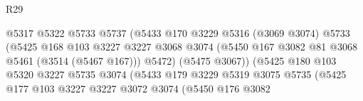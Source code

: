 \begin{lexlean}{R29}
\begin{coremodule}
                                            @5317
                                            @5322
                                            @5733
                                            @5737
                                            (@5433
                                              @170
                                              @3229
                                              @5316
                                              (@3069 @3074)
                                              @5733
                                              (@5425
                                                @168
                                                @103
                                                @3227
                                                @3227
                                                @3068
                                                @3074
                                                (@5450
                                                  @167
                                                  @3082
                                                  @81
                                                  @3068
                                                  @5461
                                                  (@3514 (@5467 @167)))
                                                @5472)
                                              (@5475 @3067))
                                            (@5425
                                              @180
                                              @103
                                              @5320
                                              @3227
                                              @5735
                                              @3074
                                              (@5433
                                                @179
                                                @3229
                                                @5319
                                                @3075
                                                @5735
                                                (@5425
                                                  @177
                                                  @103
                                                  @3227
                                                  @3227
                                                  @3072
                                                  @3074
                                                  (@5450
                                                    @176
                                                    @3082

\end{coremodule}
\end{lexlean}
